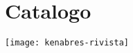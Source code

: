 {}
\chapter*{Catalogo}
\begingroup 
    \let\clearpage\relax
    \let\cleardoublepage\relax
    \let\cleardoublepage\relax
\pagestyle{scrheadings} 

\texttt{[image: kenabres-rivista]}

\endgroup 
